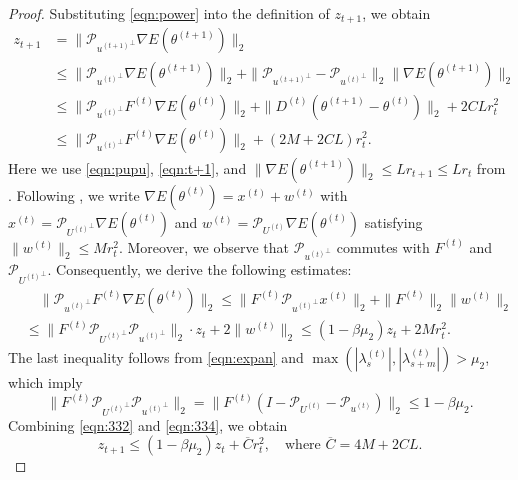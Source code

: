 \documentclass[final]{siamart251216}
\begin{document}
\begin{proof}
Substituting \eqref{eqn:power} into the definition of \(z_{t+1}\), we obtain
\begin{equation}\label{eqn:332}
\begin{aligned}
z_{t+1}&=\|\mathcal{P}_{{u^{(t+1)}}^\perp}\nabla E(\theta^{(t+1)})\|_{2}\\
&\leqslant
\|\mathcal{P}_{{u^{(t)}}^\perp}\nabla E(\theta^{(t+1)})\|_{2}+
 \|\mathcal{P}_{{u^{(t+1)}}^\perp}-\mathcal{P}_{{u^{(t)}}^\perp}\|_{2} \|\nabla E(\theta^{(t+1)})\|_{2}\\
&\leqslant
\|\mathcal{P}_{{u^{(t)}}^\perp}
F^{(t)}\nabla E(\theta^{(t)})\|_2
+\|D^{(t)}
(\theta^{(t+1)}-\theta^{(t)})\|_{2}+2CLr_{t}^{2}\\
&\leqslant\|\mathcal{P}_{{u^{(t)}}^\perp}
F^{(t)}\nabla E(\theta^{(t)})\|_2+(2M+2CL)r_{t}^{2}.
\end{aligned}
\end{equation}
Here we use \eqref{eqn:pupu}, \eqref{eqn:t+1}, 
and $\|\nabla E(\theta^{(t+1)})\|_2 
\leqslant L r_{t+1} \leqslant L r_{t}$ 
from .
Following , we write 
$\nabla E(\theta^{(t)}) = x^{(t)} + w^{(t)}$ with  $x^{(t)}=\mathcal{P}_{{U^{(t)}}^\perp}\nabla E(\theta^{(t)})$ 
and $w^{(t)}=\mathcal{P}_{U^{(t)}}\nabla E(\theta^{(t)})$ 
satisfying $\|w^{(t)}\|_2\leqslant M r_{t}^2$. 
Moreover, we observe that  
$\mathcal{P}_{{u^{(t)}}^\perp}$ commutes with $F^{(t)}$ and $\mathcal{P}_{{U^{(t)}}^\perp}$. 
Consequently, we derive the following estimates:
\begin{equation}\label{eqn:334}
\begin{aligned}
&\quad \|\mathcal{P}_{{u^{(t)}}^\perp}F^{(t)} 
\nabla E(\theta^{(t)})\|_2
\leqslant 
\|F^{(t)}{\mathcal{P}_{{u^{(t)}}^\perp} x^{(t)}}\|_2
+\|F^{(t)}\|_2
\|w^{(t)}\|_2\\
&\leqslant \|F^{(t)} \mathcal{P}_{{U^{(t)}}^\perp}{\mathcal{P}_{{u^{(t)}}^\perp}}\|_2\cdot
z_t +2\|w^{(t)}\|_2
\leqslant (1-\beta\mu_{2})z_{t}+2Mr_{t}^2.
\end{aligned}
\end{equation}
The last inequality follows from \eqref{eqn:expan} and $\max\left(|\lambda_s^{(t)}|, |\lambda_{s+m}^{(t)}|\right) > \mu_{2}$, which imply
\begin{equation}
\|F^{(t)}\mathcal{P}_{{U^{(t)}}^\perp}{\mathcal{P}_{{u^{(t)}}^\perp}}\|_2
=\|F^{(t)} (I- \mathcal{P}_{{U^{(t)}}}- \mathcal{P}_{{u^{(t)}}})\|_2
\leqslant1-\beta\mu_{2}.
\end{equation}
Combining \eqref{eqn:332} and \eqref{eqn:334}, we obtain 
\begin{equation}\label{eqn:zzz}
z_{t+1}\leqslant (1-\beta\mu_{2})z_{t}+\overline{C}r_{t}^2,
\quad \text{where } \overline{C}=4M+2CL.
\end{equation}



\end{proof}
\end{document}
